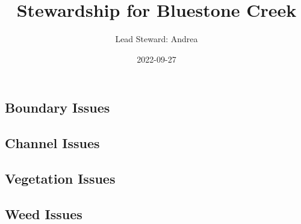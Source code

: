 \documentclass[
  landscape]{article}
\title{Stewardship for Bluestone Creek}
\author{Lead Steward: Andrea}
\date{2022-09-27}
\begin{document}
\maketitle

\hypertarget{boundary-issues}{%
\subsection{Boundary Issues}\label{boundary-issues}}

\textbar\textbar{} \textbar\textbar{} \textbar\textbar{}
\textbar\textbar{}

\hypertarget{channel-issues}{%
\subsection{Channel Issues}\label{channel-issues}}

\textbar\textbar{} \textbar\textbar{} \textbar\textbar{}
\textbar\textbar{}

\newpage

\hypertarget{vegetation-issues}{%
\subsection{Vegetation Issues}\label{vegetation-issues}}

\textbar\textbar{} \textbar\textbar{} \textbar\textbar{}
\textbar\textbar{}

\newpage

\hypertarget{weed-issues}{%
\subsection{Weed Issues}\label{weed-issues}}
\end{document}
